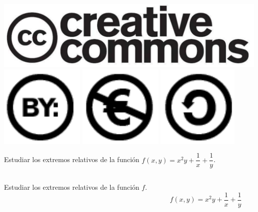 \documentclass[aspectratio=149,10pt,xcolor=dvipsnames,t]{beamer}
\begin{document}
\begin{frame}[c]
\begin{center}
\biskip
\includegraphics[scale=0.07]{img/cc-logo}
\includegraphics[scale=0.2]{img/cc-by}
\includegraphics[scale=0.2]{img/cc-e}
\includegraphics[scale=0.2]{img/cc-c}
\end{center}
\end{frame}

\begin{frame}[c]
Estudiar los extremos relativos de la función $f(x,y)=x^2y + \dfrac{1}{x} + \dfrac{1}{y}$.
\end{frame}


\begin{frame}
\begin{columns}
\begin{column}[T]{0.6\textwidth}
Estudiar los extremos relativos de la función $f$.
\end{column}
\begin{column}[T]{0.4\textwidth}
\\
$f(x,y)=x^2y + \dfrac{1}{x} + \dfrac{1}{y}$
\end{column}
\end{columns}
\end{frame}
\end{document}
